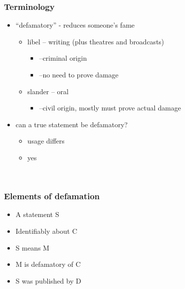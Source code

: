 \documentclass[ignorenonframetext,]{beamer}
\begin{document}
\begin{frame}
\frametitle{Terminology}

\begin{itemize}
\item  ``defamatory'' - reduces someone's fame

  \begin{itemize}
  \item    libel -- writing (plus theatres and broadcasts)

    \begin{itemize}
    \item      {--}criminal origin
    \item      {--}no need to prove damage
    \end{itemize}
  \item    slander -- oral

    \begin{itemize}
    \item      {--}civil origin, {mostly}{ must prove actual damage}
    \end{itemize}
  \end{itemize}
\item  can a true statement be defamatory?

  \begin{itemize}
  \item    usage differs
  \item    yes
  \end{itemize}
\end{itemize}

~


\end{frame}

\begin{frame}
\frametitle{Elements of defamation}

\begin{itemize}
\item  A statement S
\item  Identifiably about C
\item  S means M
\item  M is defamatory of C
\item  S was published by D
\end{itemize}

~


\end{frame}
\end{document}
